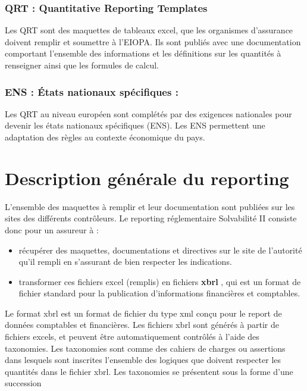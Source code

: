 \subsubsection*{QRT : Quantitative Reporting Templates}

Les QRT sont des maquettes de tableaux excel, que les organismes d'assurance doivent remplir et soumettre à l'EIOPA. Ils sont publiés avec une documentation comportant l'ensemble des informations et les définitions sur les quantités à renseigner ainsi que les formules de calcul.

\subsubsection*{ENS :  États nationaux spécifiques : }
Les QRT au niveau européen sont complétés par des exigences nationales pour devenir les états nationaux spécifiques (ENS). Les ENS permettent une adaptation des règles au contexte économique du pays.

\section{Description générale du reporting} 
 
L'ensemble des maquettes à remplir et leur documentation sont publiées sur les sites des différents contrôleurs. Le reporting réglementaire Solvabilité II consiste donc pour un assureur à :

\begin{itemize}
\item récupérer des maquettes, documentations et directives sur le site de l'autorité qu'il rempli en s'assurant de bien respecter les indications.
\item transformer ces fichiers excel (remplis) en fichiers \textbf{xbrl} , qui est un format de fichier standard pour la publication d'informations financières et comptables.
\end{itemize}

Le format xbrl est un format de fichier du type xml conçu pour le report de données comptables et financières. Les fichiers xbrl sont générés à partir de fichiers excels, et peuvent être automatiquement contrôlés à l'aide des taxonomies. Les  taxonomies sont comme des cahiers de charges ou assertions dans lesquels sont inscrites l'ensemble des logiques que doivent respecter les quantités dans le fichier xbrl. Les taxonomies se présentent sous la forme d'une succession 

